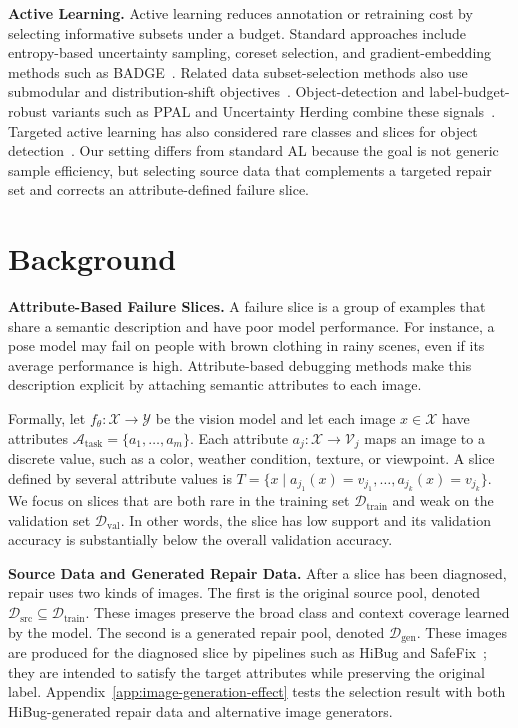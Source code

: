 \documentclass[10pt,twocolumn,letterpaper]{article}
\newcommand{\dataset}{\mathcal{D}}
\newcommand{\attrs}{\mathcal{A}_{\mathrm{task}}}
\newcommand{\vals}{\mathcal{V}}
\newcommand{\inputspace}{\mathcal{X}}
\newcommand{\labelspace}{\mathcal{Y}}
\begin{document}
\noindent\textbf{Active Learning.} Active learning reduces annotation or retraining cost by selecting informative subsets under a budget. Standard approaches include entropy-based uncertainty sampling, coreset selection, and gradient-embedding methods such as BADGE~\citep{settles2009active,sener2018active,ash2020deep}. Related data subset-selection methods also use submodular and distribution-shift objectives~\citep{wei2015submodularity,karanam2022orient}. Object-detection and label-budget-robust variants such as PPAL and Uncertainty Herding combine these signals~\citep{yang2024ppal,bae2025uncertainty}. Targeted active learning has also considered rare classes and slices for object detection~\citep{kothawade2022talisman}. Our setting differs from standard AL because the goal is not generic sample efficiency, but selecting source data that complements a targeted repair set and corrects an attribute-defined failure slice.

\section{Background}

\noindent\textbf{Attribute-Based Failure Slices.} A failure slice is a group of examples that share a semantic description and have poor model performance. For instance, a pose model may fail on people with brown clothing in rainy scenes, even if its average performance is high. Attribute-based debugging methods make this description explicit by attaching semantic attributes to each image.

Formally, let $f_\theta : \inputspace \rightarrow \labelspace$ be the vision model and let each image $x\in\inputspace$ have attributes $\attrs=\{a_1,\ldots,a_m\}$. Each attribute $a_j:\inputspace\rightarrow\vals_j$ maps an image to a discrete value, such as a color, weather condition, texture, or viewpoint. A slice defined by several attribute values is $T = \{x \mid a_{j_1}(x) = v_{j_1}, \ldots, a_{j_k}(x) = v_{j_k}\}$.
We focus on slices that are both rare in the training set $\dataset_{\mathrm{train}}$ and weak on the validation set $\dataset_{\mathrm{val}}$. In other words, the slice has low support and its validation accuracy is substantially below the overall validation accuracy.

\noindent\textbf{Source Data and Generated Repair Data.} After a slice has been diagnosed, repair uses two kinds of images. The first is the original source pool, denoted $\dataset_{\mathrm{src}}\subseteq\dataset_{\mathrm{train}}$. These images preserve the broad class and context coverage learned by the model. The second is a generated repair pool, denoted $\dataset_{\mathrm{gen}}$. These images are produced for the diagnosed slice by pipelines such as HiBug and SafeFix~\citep{chen2023hibug,xu2025safefix}; they are intended to satisfy the target attributes while preserving the original label. Appendix~\ref{app:image-generation-effect} tests the selection result with both HiBug-generated repair data and alternative image generators.
\end{document}
